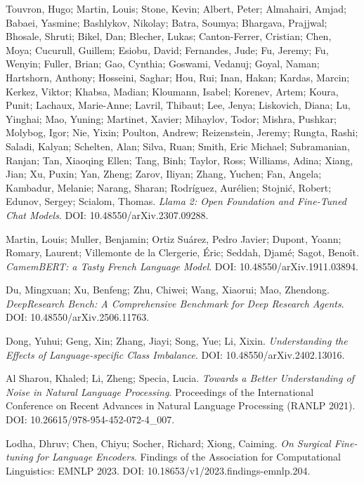 \documentclass[12pt]{article}
\begin{document}
\begin{thebibliography}{9}
Touvron, Hugo; Martin, Louis; Stone, Kevin; Albert, Peter; Almahairi, Amjad; Babaei, Yasmine; Bashlykov, Nikolay; Batra, Soumya; Bhargava, Prajjwal; Bhosale, Shruti; Bikel, Dan; Blecher, Lukas; Canton-Ferrer, Cristian; Chen, Moya; Cucurull, Guillem; Esiobu, David; Fernandes, Jude; Fu, Jeremy; Fu, Wenyin; Fuller, Brian; Gao, Cynthia; Goswami, Vedanuj; Goyal, Naman; Hartshorn, Anthony; Hosseini, Saghar; Hou, Rui; Inan, Hakan; Kardas, Marcin; Kerkez, Viktor; Khabsa, Madian; Kloumann, Isabel; Korenev, Artem; Koura, Punit; Lachaux, Marie-Anne; Lavril, Thibaut; Lee, Jenya; Liskovich, Diana; Lu, Yinghai; Mao, Yuning; Martinet, Xavier; Mihaylov, Todor; Mishra, Pushkar; Molybog, Igor; Nie, Yixin; Poulton, Andrew; Reizenstein, Jeremy; Rungta, Rashi; Saladi, Kalyan; Schelten, Alan; Silva, Ruan; Smith, Eric Michael; Subramanian, Ranjan; Tan, Xiaoqing Ellen; Tang, Binh; Taylor, Ross; Williams, Adina; Xiang, Jian; Xu, Puxin; Yan, Zheng; Zarov, Iliyan; Zhang, Yuchen; Fan, Angela; Kambadur, Melanie; Narang, Sharan; Rodríguez, Aurélien; Stojnić, Robert; Edunov, Sergey; Scialom, Thomas.
\textit{Llama 2: Open Foundation and Fine-Tuned Chat Models}.
DOI: 10.48550/arXiv.2307.09288.

Martin, Louis; Muller, Benjamin; Ortiz Suárez, Pedro Javier; Dupont, Yoann; Romary, Laurent; Villemonte de la Clergerie, Éric; Seddah, Djamé; Sagot, Benoît.
\textit{CamemBERT: a Tasty French Language Model}.
DOI: 10.48550/arXiv.1911.03894.

Du, Mingxuan; Xu, Benfeng; Zhu, Chiwei; Wang, Xiaorui; Mao, Zhendong.
\textit{DeepResearch Bench: A Comprehensive Benchmark for Deep Research Agents}.
DOI: 10.48550/arXiv.2506.11763.

Dong, Yuhui; Geng, Xin; Zhang, Jiayi; Song, Yue; Li, Xixin.
\textit{Understanding the Effects of Language-specific Class Imbalance}.
DOI: 10.48550/arXiv.2402.13016.

Al Sharou, Khaled; Li, Zheng; Specia, Lucia.
\textit{Towards a Better Understanding of Noise in Natural Language Processing}.
Proceedings of the International Conference on Recent Advances in Natural Language Processing (RANLP 2021).
DOI: 10.26615/978-954-452-072-4\_007.

Lodha, Dhruv; Chen, Chiyu; Socher, Richard; Xiong, Caiming.
\textit{On Surgical Fine-tuning for Language Encoders}.
Findings of the Association for Computational Linguistics: EMNLP 2023.
DOI: 10.18653/v1/2023.findings-emnlp.204.


\end{thebibliography}
\end{document}
